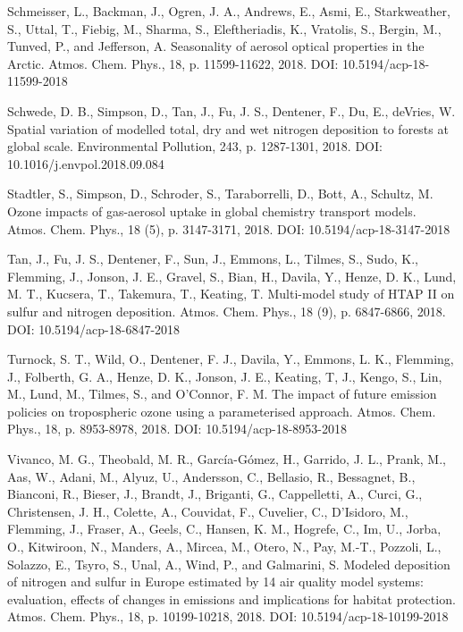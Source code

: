 \begin{list}{}{\setlength{\leftmargin}{15pt}\setlength{\itemindent}{-\leftmargin}}
\item[]
Schmeisser, L., Backman, J., Ogren, J. A., Andrews, E., Asmi, E., Starkweather, S., Uttal, T., Fiebig, M., Sharma, S., Eleftheriadis, K., Vratolis, S., Bergin, M., Tunved, P., and Jefferson, A.
Seasonality of aerosol optical properties in the Arctic.  
Atmos. Chem. Phys., 18, p. 11599-11622, 2018.
DOI: 10.5194/acp-18-11599-2018

\item[]
Schwede, D. B., Simpson, D., Tan, J., Fu, J. S., Dentener, F., Du, E., deVries, W. 
Spatial variation of modelled total, dry and wet nitrogen deposition to forests at global scale. 
Environmental Pollution, 243, p. 1287-1301, 2018. 
DOI: 10.1016/j.envpol.2018.09.084

\item[]
Stadtler, S., Simpson, D., Schroder, S., Taraborrelli, D., Bott, A., Schultz, M. 
Ozone impacts of gas-aerosol uptake in global chemistry transport models. 
Atmos. Chem. Phys., 18 (5), p. 3147-3171, 2018. 
DOI: 10.5194/acp-18-3147-2018

\item
Tan, J., Fu, J. S., Dentener, F., Sun, J., Emmons, L., Tilmes, S., Sudo, K., Flemming, J., Jonson, J. E., Gravel, S., Bian, H., Davila, Y., Henze, D. K., Lund, M. T., Kucsera, T., Takemura, T., Keating, T. 
Multi-model study of HTAP II on sulfur and nitrogen deposition. 
Atmos. Chem. Phys., 18 (9), p. 6847-6866, 2018. 
DOI: 10.5194/acp-18-6847-2018

\item[]
Turnock, S. T., Wild, O., Dentener, F. J., Davila, Y., Emmons, L. K., Flemming, J., Folberth, G. A., Henze, D. K., Jonson, J. E., Keating, T, J., Kengo, S., Lin, M., Lund, M., Tilmes, S., and O'Connor, F. M.
The impact of future emission policies on tropospheric ozone using a parameterised approach.
Atmos. Chem. Phys., 18, p. 8953-8978, 2018. DOI: 10.5194/acp-18-8953-2018

\item[]
Vivanco, M. G., Theobald, M. R., Garc\'{i}a-G\'{o}mez, H., Garrido, J. L., Prank, M., Aas, W., Adani, M., Alyuz, U., Andersson, C., Bellasio, R., Bessagnet, B., Bianconi, R., Bieser, J., Brandt, J., Briganti, G., Cappelletti, A., Curci, G., Christensen, J. H., Colette, A., Couvidat, F., Cuvelier, C., D'Isidoro, M., Flemming, J., Fraser, A., Geels, C., Hansen, K. M., Hogrefe, C., Im, U., Jorba, O., Kitwiroon, N., Manders, A., Mircea, M., Otero, N., Pay, M.-T., Pozzoli, L., Solazzo, E., Tsyro, S., Unal, A., Wind, P., and Galmarini, S. 
Modeled deposition of nitrogen and sulfur in Europe estimated by 14 air quality model systems: evaluation, effects of changes in emissions and implications for habitat protection. 
Atmos. Chem. Phys., 18, p. 10199-10218, 2018. DOI: 10.5194/acp-18-10199-2018


\end{list}
